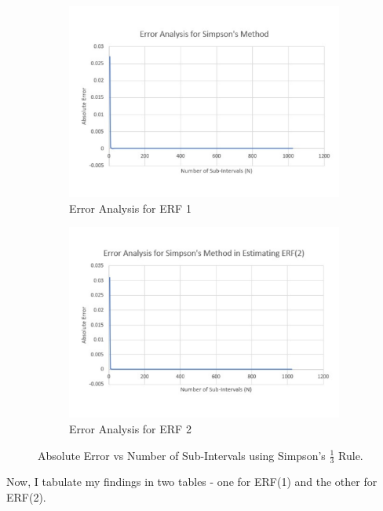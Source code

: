 \documentclass[titlepage, 11pt]{article}
\begin{document}
\begin{figure}[ht]
\begin{subfigure}{.5\textwidth}
  \centering
  \includegraphics[width=\linewidth]{SR2ERF1.pdf}
  \caption{Error Analysis for ERF 1}
  \label{fig:q2c1}
\end{subfigure}
\begin{subfigure}{.5\textwidth}
  \centering
  \includegraphics[width=\linewidth]{SR2ERF2.pdf}
  \caption{Error Analysis for ERF 2}
  \label{fig:q2c2}
\end{subfigure}
\caption{Absolute Error vs Number of Sub-Intervals using Simpson's $\frac{1}{3}$ Rule.}
\label{fig:q2c}
\end{figure}

Now, I tabulate my findings in two tables - one for ERF(1) and the other for ERF(2).
\end{document}
